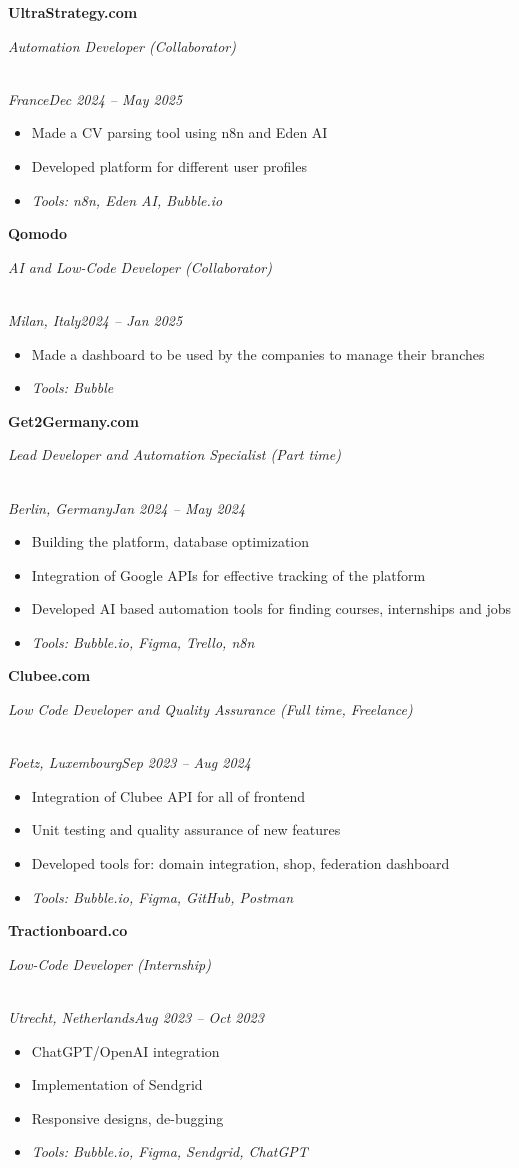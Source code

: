 \documentclass[a4paper,10pt]{article}
\newcommand{\role}[4]{\vspace{3pt}\noindent\hspace{0.6em}\parbox[t]{0.38\textwidth}{\raggedright\textbf{#1}}\hfill\parbox[t]{0.58\textwidth}{\raggedleft\textit{#2}}\\{\textit{#3}\hfill\textit{#4}}\vspace{1pt}}
\begin{document}
\role{UltraStrategy.com}{Automation Developer (Collaborator)}{France}{Dec 2024 -- May 2025}
\begin{itemize}
\item Made a CV parsing tool using n8n and Eden AI
\item Developed platform for different user profiles
\item \textit{Tools: n8n, Eden AI, Bubble.io}
\end{itemize}

\role{Qomodo}{AI and Low-Code Developer (Collaborator)}{Milan, Italy}{2024 -- Jan 2025}
\begin{itemize}
\item Made a dashboard to be used by the companies to manage their branches
\item \textit{Tools: Bubble}
\end{itemize}

\role{Get2Germany.com}{Lead Developer and Automation Specialist (Part time)}{Berlin, Germany}{Jan 2024 -- May 2024}
\begin{itemize}
\item Building the platform, database optimization
\item Integration of Google APIs for effective tracking of the platform
\item Developed AI based automation tools for finding courses, internships and jobs
\item \textit{Tools: Bubble.io, Figma, Trello, n8n}
\end{itemize}

\role{Clubee.com}{Low Code Developer and Quality Assurance (Full time, Freelance)}{Foetz, Luxembourg}{Sep 2023 -- Aug 2024}
\begin{itemize}
\item Integration of Clubee API for all of frontend
\item Unit testing and quality assurance of new features
\item Developed tools for: domain integration, shop, federation dashboard
\item \textit{Tools: Bubble.io, Figma, GitHub, Postman}
\end{itemize}

\role{Tractionboard.co}{Low-Code Developer (Internship)}{Utrecht, Netherlands}{Aug 2023 -- Oct 2023}
\begin{itemize}
\item ChatGPT/OpenAI integration
\item Implementation of Sendgrid
\item Responsive designs, de-bugging
\item \textit{Tools: Bubble.io, Figma, Sendgrid, ChatGPT}
\end{itemize}
\end{document}
